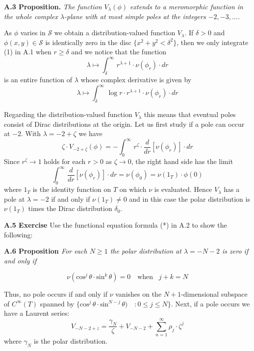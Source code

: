 \noindent
{\bf{A.3 Proposition.}} \emph{The function $V_\lambda(\phi)$ 
extends to a meromorphic
function in the whole complex
$\lambda$-plane with at most simple poles at
the integers $-2,-3,\ldots$.}



\bigskip


As $\phi$ varies in $\mathcal S$ 
we obtain a
distribution-valued function
$V_\lambda$.
If $\delta>0$ and 
$\phi(x,y)\in\mathcal S$ is identically zero in the
disc $\{x^2+y^2<\delta^2\}$, then we only integrate
(1) in A.1 when $r\geq\delta$ and we notice that the function
\[
 \lambda\mapsto \int_\delta^\infty\,
r^{\lambda+1}\cdot \nu(\phi_r)\cdot dr
\]
is an entire function of $\lambda$ whose complex derivative is given by
\[
 \lambda\mapsto \int_\delta^\infty\,
\log r\cdot r^{\lambda+1}\cdot \nu(\phi_r)\cdot dr
\]

\medskip

\noindent
Regarding the distribution-valued function $V_\lambda$
this means that 
eventual poles  consist of Dirac distributions at the origin.
Let us first study if   a pole can occur  at $-2$.
With $\lambda=-2+\zeta$ we have
\[
\zeta\cdot V_{-2+\zeta}(\phi)=-
\int_0^\infty\, r^\zeta\cdot 
\frac{d}{dr}[\nu(\phi_r)]\cdot dr\tag{i}
\]
Since $r^\zeta\to 1$ holds for each $r>0$ as
$\zeta\to 0$, the right hand side has the limit
\[
\int_0^\infty\, 
\frac{d}{dr}[\nu(\phi_r)]\cdot dr=\nu(\phi_0)=
\nu(1_T)\cdot \phi(0)\tag{ii}
\]
where $1_T$ is the identity function on $T$ on which $\nu$ is evaluated.
Hence $V_\lambda$ has a pole at $\lambda=-2$ if and only if
$\nu(1_T)\neq 0$ and in this case the polar distribution is
$\nu(1_T)$ times the Dirac distribution $\delta_0$.

\medskip

\noindent
{\bf{A.5 Exercise}}
Use the functional equation formula (*)
in A.2 to show the following:

\bigskip


\noindent
{\bf{A.6 Proposition }}
\emph{For each $N\geq 1$ the polar distribution at
$\lambda=-N-2$ is zero if and only if }

\[ 
\nu(\text{cos}^j\,\theta\cdot \text{sin}^k\,\theta)=0
\quad\text{when }\,\,\,j+k=N
\]

\medskip

\noindent
Thus, no pole occurs if and only if $\nu$ vanishes on the
$N+1$-dimensional subspace of $C^\infty(T)$
spanned by
$\{\text{cos}^j\,\theta\cdot \text{sin}^{N-j}\,\theta)\quad\colon
0\leq j\leq N\}$.
Next, if a pole occurs we have a Laurent series:
\[
V_{-N-2+z}=
\frac{\gamma_N}{\zeta}+ V_{-N-2}+\sum_{n=1}^\infty
\rho_j\cdot \zeta^j
\]
where $\gamma_N$ is the polar distribution.
\medskip

